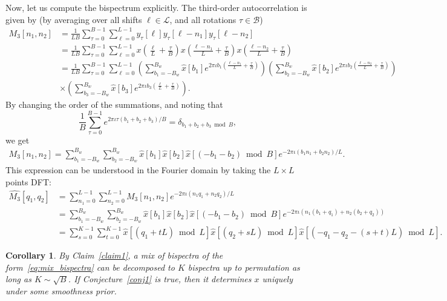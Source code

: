 \documentclass[english,12pt]{article}
\newcommand{\I}{\iota}
\newcommand{\tB}{B_w}
\numberwithin{equation}{section}
\newtheorem{cor}{Corollary}
\begin{document}
Now, let us  compute the bispectrum explicitly. The third-order autocorrelation is given by (by averaging over all shifts $\ell\in\mathcal{L}$, and all rotations $\tau\in\mathcal{B}$)
\begin{equation}
\begin{split}
M_3[n_1,n_2] &= \frac{1}{LB}\sum_{\tau=0}^{B-1}\sum_{\ell=0}^{L-1} y_\tau[\ell] y_\tau[\ell-n_1] y_\tau[\ell-n_2]\\ 
&= \frac{1}{LB}\sum_{\tau=0}^{B-1}\sum_{\ell=0}^{L-1} x\left(\frac{\ell}{L} + \frac{\tau}{B}\right) x\left(\frac{\ell-n_1}{L} + \frac{\tau}{B}\right)
x\left(\frac{\ell-n_2}{L} + \frac{\tau}{B}\right)\\
&= \frac{1}{LB}\sum_{\tau=0}^{B-1}\sum_{\ell=0}^{L-1} 
\left(\sum_{b_1=-\tB}^{\tB}\hat{x}[b_1]e^{2\pi\I b_1 \left(\frac{\ell-n_1}{L} + \frac{\tau}{B}\right) }\right) 
\left(\sum_{b_2=-\tB}^{\tB}\hat{x}[b_2]e^{2\pi\I b_2 \left(\frac{\ell-n_2}{L} + \frac{\tau}{B}\right) } \right) \\
&\times \left(\sum_{b_3=-\tB}^{\tB}\hat{x}[b_3]e^{2\pi\I b_3 \left(\frac{\ell}{L} + \frac{\tau}{B}\right) }\right). 
\end{split}
\end{equation}
By changing the order of the summations, and noting that 
\begin{equation} \label{eq:sum}
\frac{1}{B}\sum_{\tau=0}^{B-1}e^{2\pi\I\tau (b_1+b_2+b_3)/B} = \delta_{b_1+b_2+b_3\bmod B},
\end{equation}
we get 
\begin{equation}
\begin{split}
M_3[n_1,n_2] = 
\sum_{b_1=-\tB}^{\tB}\sum_{b_2=-\tB}^{\tB}\hat{x}[b_1]\hat{x}[b_2]\hat{x}[(-b_1-b_2)\bmod B]e^{-2\pi\I (b_1n_1 + b_2n_2)/L}.
\end{split}
\end{equation}
This expression can be understood in the Fourier domain by taking the $L\times L$ points DFT: 
\begin{equation} \label{eq:mix_bispectra}
\begin{split}
\hat{M_3}[q_1,q_2] &= \sum_{n_1=0}^{L-1} \sum_{n_2=0}^{L-1}
M_3[n_1,n_2]e^{-2\pi\I(n_1q_1+n_2q_2)/L} \\ &=  
\sum_{b_1=-\tB}^{\tB}\sum_{b_2=-\tB}^{\tB}\hat{x}[b_1]\hat{x}[b_2]\hat{x}[(-b_1-b_2)\bmod B]e^{-2\pi\I (n_1(b_1+q_1) + n_2(b_2+q_2))} \\ & = \sum_{s=0}^{K-1} \sum_{t=0}^{K-1} \hat{x}[(q_1 + tL)\bmod L] \hat{x}[(q_2 + sL)\bmod L]\hat{x}[(-q_1-q_2 - (s+t)L)\bmod L].
\end{split}
\end{equation}
\begin{cor}
	By Claim~\ref{claim1}, a mix of bispectra of the form~\eqref{eq:mix_bispectra} can be decomposed to $K$ bispectra up to permutation as long as $K\sim\sqrt{B}$. If Conjecture~\ref{conj1} is true, then it determines $x$ uniquely under some smoothness prior.  
\end{cor}
\end{document}
